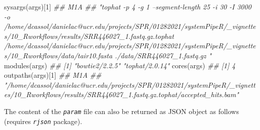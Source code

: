 \documentclass[14pt,]{article}
\newcommand{\hlnum}[1]{\textcolor[rgb]{0.816,0.125,0.439}{#1}}%
\newcommand{\hlcom}[1]{\textcolor[rgb]{0.502,0.502,0.502}{\textit{#1}}}%
\newcommand{\hlstd}[1]{\textcolor[rgb]{0.251,0.251,0.251}{#1}}%
\newcommand{\hlkwd}[1]{\textcolor[rgb]{0.878,0.439,0.125}{#1}}%
\newenvironment{Shaded}{\begin{myshaded}}{\end{myshaded}}
\newcommand{\KeywordTok}[1]{\hlkwd{#1}}
\newcommand{\DecValTok}[1]{\hlnum{#1}}
\newcommand{\CommentTok}[1]{\hlcom{#1}}
\newcommand{\NormalTok}[1]{\hlstd{#1}}
\begin{document}
\begin{Shaded}
\begin{Highlighting}[]
\KeywordTok{sysargs}\NormalTok{(args)[}\DecValTok{1}\NormalTok{]}
\CommentTok{##                                                                                                                                                                                                                                                                                                                            M1A }
\CommentTok{## "tophat -p 4 -g 1 --segment-length 25 -i 30 -I 3000 -o /home/dcassol/danielac@ucr.edu/projects/SPR/01282021/systemPipeR/_vignettes/10_Rworkflows/results/SRR446027_1.fastq.gz.tophat /home/dcassol/danielac@ucr.edu/projects/SPR/01282021/systemPipeR/_vignettes/10_Rworkflows/data/tair10.fasta ./data/SRR446027_1.fastq.gz "}
\KeywordTok{modules}\NormalTok{(args)}
\CommentTok{## [1] "bowtie2/2.2.5" "tophat/2.0.14"}
\KeywordTok{cores}\NormalTok{(args)}
\CommentTok{## [1] 4}
\KeywordTok{outpaths}\NormalTok{(args)[}\DecValTok{1}\NormalTok{]}
\CommentTok{##                                                                                                                                               M1A }
\CommentTok{## "/home/dcassol/danielac@ucr.edu/projects/SPR/01282021/systemPipeR/_vignettes/10_Rworkflows/results/SRR446027_1.fastq.gz.tophat/accepted_hits.bam"}
\end{Highlighting}
\end{Shaded}

The content of the \emph{\texttt{param}} file can also be returned as JSON object as follows (requires \emph{\texttt{rjson}} package).
\end{document}
